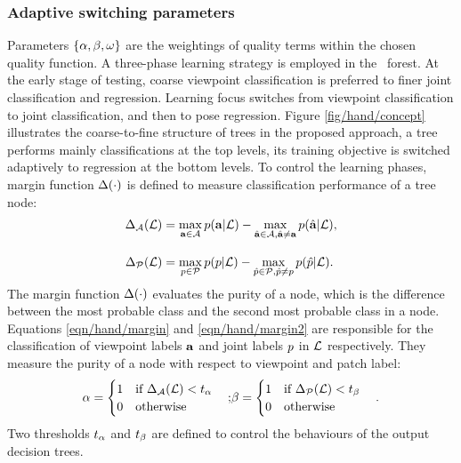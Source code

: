 \subsubsection{Adaptive switching parameters} 
Parameters $\{ \alpha, \beta, \omega \}$ are the weightings of quality terms within the chosen quality function.   
A three-phase learning strategy is employed in the \STR\ forest. At the early stage of testing, coarse viewpoint classification is preferred to finer joint classification and regression. 
Learning focus switches from viewpoint classification to joint classification, and then to pose regression.  
Figure \ref{fig/hand/concept} illustrates the coarse-to-fine structure of trees in the proposed approach, a tree performs mainly classifications at the top levels, its training objective is switched adaptively to regression at the bottom levels. To control the learning phases, margin function $\Delta(\cdot)$ is defined to measure classification performance of a tree node: 
\begin{align}
	\label{eqn/hand/margin} 
	\Delta_{\mathcal{A}}(\mathcal{L}) & = 
	\max_{\mathbf{a} \in \mathcal{A}} p(\mathbf{a} | \mathcal{L}) - 
	\max_{\hat{\mathbf{a}} \in \mathcal{A}, \hat{\mathbf{a}} \not= \mathbf{a}} p(\hat{\mathbf{a}} | \mathcal{L}), \\[3mm] 
	\label{eqn/hand/margin2} 
	\Delta_{\mathcal{P}}(\mathcal{L}) & = 
	\max_{p \in \mathcal{P}} p(p | \mathcal{L}) - 
	\max_{\hat{p} \in \mathcal{P}, \hat{p} \not= p} p(\hat{p} | \mathcal{L}).
\end{align}
The margin function $\Delta(\cdot)$ evaluates the purity of a node, which is the difference between the most probable class and the second most probable class in a node. 
Equations \ref{eqn/hand/margin} and \ref{eqn/hand/margin2} are responsible for the classification of viewpoint labels $\mathbf{a}$ and joint labels $p$ in $\mathcal{L}$ respectively. They measure the purity of a node with respect to viewpoint and patch label:
\begin{equation}
	\begin{array}{l@{}r}
		\viewparam  = 
		\begin{cases}
			1\mbox{ ~~if } \margin_{\viewlabelset}(\clset) < t_{\viewparam} \\
			0\mbox{ ~~otherwise }
		\end{cases}; & 
		\classparam = 
		\begin{cases}
			1\mbox{ ~~if } \margin_{\jointlabelset}(\clset) < t_{\classparam} \\
			0\mbox{ ~~otherwise}
		\end{cases}.
	\end{array}
	\label{eq:switchparam}
\end{equation}
Two thresholds $t_{\alpha}$ and $t_{\beta}$ are defined to control the behaviours of the output decision trees. 

